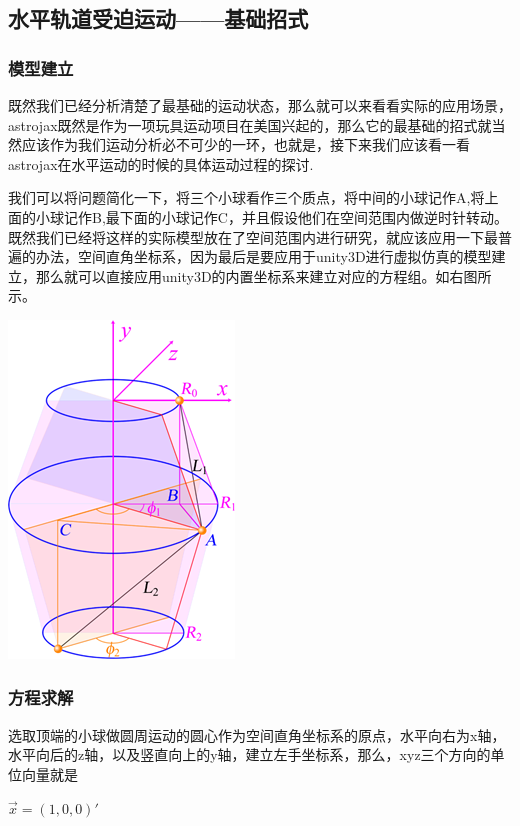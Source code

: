 \documentclass[12pt,a4paper]{ctexart}
\begin{document}
	\subsection{水平轨道受迫运动——基础招式}
	\subsubsection{模型建立}
	既然我们已经分析清楚了最基础的运动状态，那么就可以来看看实际的应用场景，astrojax既然是作为一项玩具运动项目在美国兴起的，那么它的最基础的招式就当然应该作为我们运动分析必不可少的一环，也就是，接下来我们应该看一看astrojax在水平运动的时候的具体运动过程的探讨.
	\clearpage
	\thispagestyle{empty}
	\begin{minipage}[b]{0.65\linewidth}
		我们可以将问题简化一下，将三个小球看作三个质点，将中间的小球记作A,将上面的小球记作B,最下面的小球记作C，并且假设他们在空间范围内做逆时针转动。既然我们已经将这样的实际模型放在了空间范围内进行研究，就应该应用一下最普遍的办法，空间直角坐标系，因为最后是要应用于unity3D进行虚拟仿真的模型建立，那么就可以直接应用unity3D的内置坐标系来建立对应的方程组。如右图所示。
	\end{minipage}
	\hfill
	\begin{minipage}[b]{0.35\linewidth}
		\includegraphics[height=8\baselineskip]{T07.png}
	\end{minipage}
	\subsubsection{方程求解}
	选取顶端的小球做圆周运动的圆心作为空间直角坐标系的原点，水平向右为x轴，水平向后的z轴，以及竖直向上的y轴，建立左手坐标系，那么，xyz三个方向的单位向量就是
	
	$\vec{x}=(1,0,0)'$
	
\end{document}
